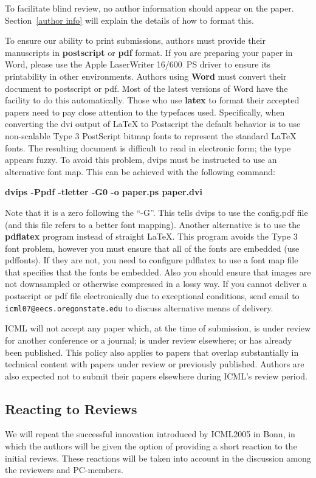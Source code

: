 \documentclass{article}
\begin{document}
To facilitate blind review, no author information should appear on 
the paper.  
Section~\ref{author info} will explain the details of how to format this.

To ensure our ability to print submissions, authors must provide their
manuscripts in \textbf{postscript} or \textbf{pdf} format. If you are
preparing your paper in Word, please use the Apple LaserWriter
16/600~PS driver to ensure its printability in other environments.  
Authors using \textbf{Word} must convert their document to postscript or pdf. 
Most of the latest versions of Word have the facility to do this automatically.
Those who use \textbf{latex} to format their accepted papers need to pay close attention to the typefaces used. 
Specifically, when converting the dvi output of LaTeX to Postscript the default behavior is to use non-scalable Type 3 PostScript 
bitmap fonts to represent the standard LaTeX fonts. The resulting document is difficult to read in electronic form; 
the type appears fuzzy. To avoid this problem, dvips must be instructed to use an alternative font map. 
This can be achieved with the following command:
\begin{center}
\textbf{ dvips -Ppdf -tletter -G0 -o paper.ps paper.dvi}
\end{center}

Note that it is a zero following the ``-G''. This tells dvips to use the
config.pdf file (and this file refers to a better font
mapping). Another alternative is to use the \textbf{pdflatex} program instead of straight
LaTeX. This program avoids the Type 3 font problem, however you
must ensure that all of the fonts are embedded (use pdffonts). If they
are not, you need to configure pdflatex to use a font map file that
specifies that the fonts be embedded. Also you should ensure that
images are not downsampled or otherwise compressed in a lossy way.
If you cannot deliver a postscript or pdf file electronically due to
exceptional conditions, send email to \texttt{icml07@eecs.oregonstate.edu} to
discuss alternative means of delivery.

ICML will not accept any paper which, at the time of submission, is
under review for another conference or a journal; is under review
elsewhere; or has already been published. This policy also applies to
papers that overlap substantially in technical content with papers
under review or previously published. Authors are also expected not to
submit their papers elsewhere during ICML's review period.

\subsection{Reacting to Reviews}
We will repeat the successful innovation introduced by ICML2005 in
Bonn, in which the authors will be given the option of providing a
short reaction to the initial reviews. 
These reactions will be taken into account in the discussion among the
reviewers and PC-members.
\end{document}
